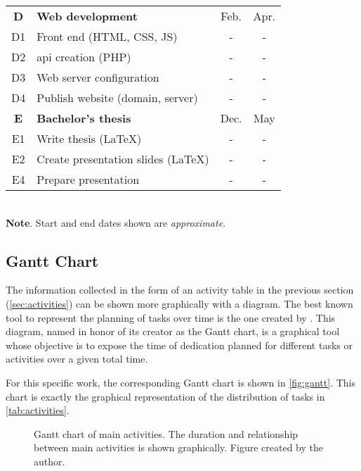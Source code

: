 \begin{table}[p]
\begin{tabular}{cp{}cc}
    \textbf{D} & \textbf{Web development}         & Feb. & Apr. \\
    D1         & Front end (HTML, CSS, JS)        & -    & -    \\
    D2         & \Acs{api} creation (PHP)         & -    & -    \\
    D3         & Web server configuration         & -    & -    \\
    D4         & Publish website (domain, server) & -    & -    \\
    \midrule

    \rowcolor{rowColor}
    \textbf{E}             & \textbf{Bachelor's thesis}          & Dec. & May \\
    \rowcolor{rowColor}
    E1                     & Write thesis (\LaTeX)               & -    & -   \\
    \rowcolor{rowColor}
    E2                     & Create presentation slides (\LaTeX) & -    & -   \\
    \rowcolor{rowColor} E4 & Prepare presentation                & -    & -   \\
    \bottomrule
  \end{tabular}\\[1.25ex]
  {\small\textbf{Note}. Start and end dates shown are \emph{approximate}.}
\end{table}


\subsection{Gantt Chart}\label{sec:gantt}

The information collected in the form of an activity table in the previous
section (\vref{sec:activities}) can be shown more graphically with a
diagram. The best known tool to represent the planning of tasks over time is
the one created by . This
diagram, named in honor of its creator as the Gantt chart, is a graphical tool
whose objective is to expose the time of dedication planned for different tasks
or activities over a given total time.

For this specific work, the corresponding Gantt chart is shown in
\vref{fig:gantt}. This chart is exactly the graphical representation of the
distribution of tasks in \vref{tab:activities}.

\begin{figure}[ht]
  \centering
  
  \vspace{-.6cm} %
  \caption[Gantt chart of main activities]{Gantt chart of main activities. The
    duration and relationship between main activities is shown
    graphically. Figure created by the author.}\label{fig:gantt}
\end{figure}



